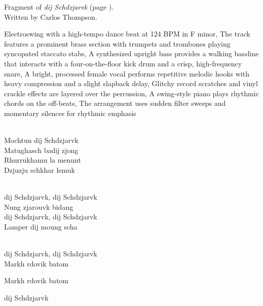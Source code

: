 
\begin{notes}
Fragment of \emph{dij Schdzjarvk} (page \pageref{sec:dij-schdzjarvk}).\\
Written by Carlos Thompson.
\end{notes}
\begin{style}
Electroswing with a high-tempo dance beat at 124 BPM in F minor, The track features a prominent brass section with trumpets and trombones playing syncopated staccato stabs, A synthesized upright bass provides a walking bassline that interacts with a four-on-the-floor kick drum and a crisp, high-frequency snare, A bright, processed female vocal performs repetitive melodic hooks with heavy compression and a slight slapback delay, Glitchy record scratches and vinyl crackle effects are layered over the percussion, A swing-style piano plays rhythmic chords on the off-beats, The arrangement uses sudden filter sweeps and momentary silences for rhythmic emphasis
\end{style}
\begin{lyrics}
\\
Mochtun dij Schdzjarvk
\\
Matughasch badij zjong
\\
Rhurrukhamu la menunt\\
Dzjuzju schkhar lemuk

\\
dij Schdzjarvk, dij Schdzjarvk\\
Nung zjarouvk bidang\\
dij Schdzjarvk, dij Schdzjarvk\\
Lamper dij moung scha

\\
dij Schdzjarvk, dij Schdzjarvk\\
Markh rdovik batom

Markh rdovik batom

dij Schdzjarvk
\end{lyrics}

